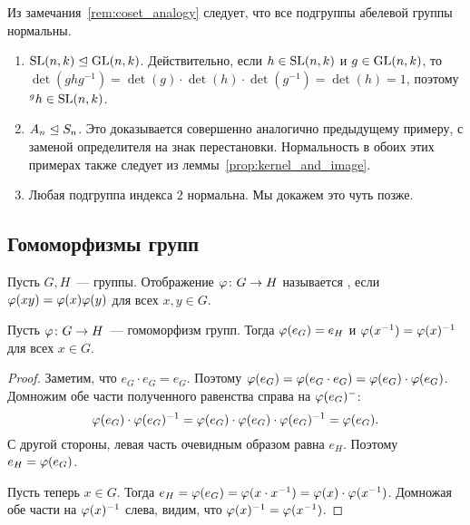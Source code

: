 \begin{remark}
Из замечания~\ref{rem:coset_analogy} следует, что все подгруппы
абелевой группы нормальны.
\end{remark}

\hspace{0em}
\begin{examples}\label{examples:normal_subgroups}
\hspace{1em}
\begin{enumerate}
\item $\operatorname{SL}(n,k)\trianglelefteq\operatorname{GL}(n,k)$. Действительно, если $h\in\operatorname{SL}(n,k)$ и
  $g\in\operatorname{GL}(n,k)$, то $\det(ghg^{-1}) =
  \det(g)\cdot\det(h)\cdot\det(g^{-1}) = \det(h) = 1$, поэтому
  ${}^gh\in\operatorname{SL}(n,k)$.
\item $A_n\trianglelefteq S_n$. Это доказывается совершенно аналогично
  предыдущему примеру, с заменой определителя на знак
  перестановки. Нормальность в обоих этих примерах также следует из
  леммы~\ref{prop:kernel_and_image}.
\item\label{item:normal_subgroup_of_index_2} Любая подгруппа индекса
  $2$ нормальна. Мы докажем это чуть позже.
\end{enumerate}
\end{examples}

\subsection{Гомоморфизмы групп}


\begin{definition}
Пусть $G,H$~--- группы.
Отображение $\varphi\colon G\to H$ называется ,
если $\varphi(xy) = \varphi(x)\varphi(y)$ для всех $x,y\in G$.
\end{definition}
\begin{lemma}
Пусть $\varphi\colon G\to H$~--- гомоморфизм групп. Тогда $\varphi(e_G) = e_H$
и $\varphi(x^{-1}) = \varphi(x)^{-1}$ для всех $x\in G$.
\end{lemma}
\begin{proof}
Заметим, что $e_G\cdot e_G = e_G$. Поэтому $\varphi(e_G) = \varphi(e_G\cdot
e_G) = \varphi(e_G)\cdot \varphi(e_G)$. Домножим обе части полученного
равенства справа на $\varphi(e_G)^{-}$:
$$
\varphi(e_G)\cdot \varphi(e_G)^{-1} = \varphi(e_G)\cdot \varphi(e_G)\cdot
\varphi(e_G)^{-1} = \varphi(e_G).
$$
С другой стороны, левая часть очевидным образом равна $e_H$.
Поэтому $e_H = \varphi(e_G)$.

Пусть теперь $x\in G$. Тогда $e_H = \varphi(e_G) = \varphi(x\cdot x^{-1}) =
\varphi(x)\cdot \varphi(x^{-1})$. 
Домножая обе части на $\varphi(x)^{-1}$ слева, видим, что
$\varphi(x)^{-1} = \varphi(x^{-1})$.
\end{proof}

